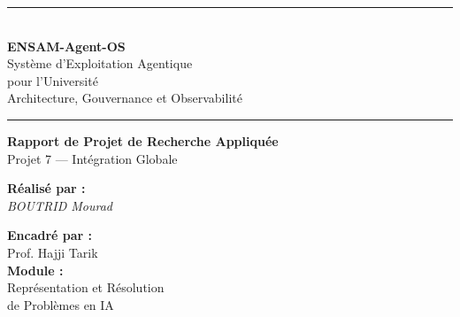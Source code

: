 \documentclass[12pt, a4paper]{article}
\begin{document}

\begin{titlepage}
\begin{center}

\vspace*{1cm}


\vspace{1.5cm}

\rule{\textwidth}{1.5pt}\\[0.5cm]
{\Huge\bfseries\color{ensamprimary} ENSAM-Agent-OS}\\[0.4cm]
{\LARGE Système d'Exploitation Agentique\\pour l'Université}\\[0.3cm]
{\Large Architecture, Gouvernance et Observabilité}\\[0.5cm]
\rule{\textwidth}{1.5pt}

\vspace{1cm}

{\large\textbf{Rapport de Projet de Recherche Appliquée}}\\[0.3cm]
{\large Projet 7 — Intégration Globale}

\vspace{1.5cm}

\begin{minipage}[t]{0.45\textwidth}
\begin{flushleft}
\textbf{Réalisé par :}\\[0.3cm]
 \textit{BOUTRID Mourad}\\
\end{flushleft}
\end{minipage}
\hfill
\begin{minipage}[t]{0.45\textwidth}
\begin{flushright}
\textbf{Encadré par :}\\[0.3cm]
Prof. Hajji Tarik\\[0.5cm]
\textbf{Module :}\\[0.3cm]
Représentation et Résolution\\de Problèmes en IA\\
\end{flushright}
\end{minipage}


\end{center}
\end{titlepage}
\end{document}
